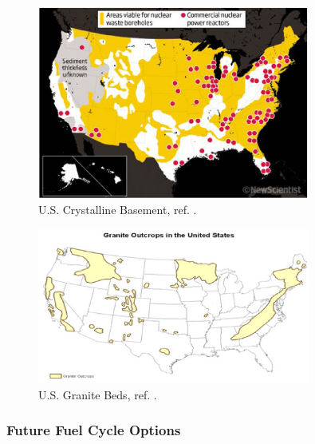 \begin{frame}[ctb!]
\begin{minipage}{0.44\textwidth}
\begin{figure}[h!]
         \includegraphics[width=0.8\textwidth]{cyder/images/boreholeNewScientist.eps}
         \caption{U.S. Crystalline Basement, ref.  \cite{newscientist_where_2011}.}
     \end{figure}
     \begin{figure}[h!]
         \includegraphics[width=0.8\textwidth]{cyder/images/graniteBush.eps}
         \caption{U.S. Granite Beds, ref. \cite{bush_economic_1976}.}
     \end{figure}
   \end{minipage}
\end{frame}


\begin{frame}[ctb!]
  \frametitle{Future Fuel Cycle Options}
    
\end{frame}


